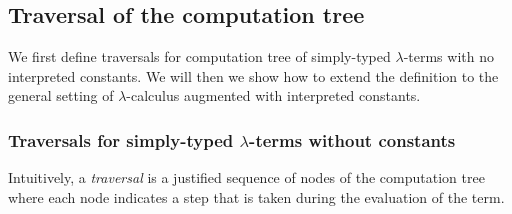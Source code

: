 \subsection{Traversal of the computation tree}
\label{subsec:traversal} We first define traversals for computation
tree of simply-typed $\lambda$-terms with no interpreted constants.
We will then we show how to extend the definition to the general
setting of $\lambda$-calculus augmented with interpreted constants.

\subsubsection{Traversals for simply-typed $\lambda$-terms without constants}
Intuitively, a \emph{traversal} is a justified sequence of nodes of the computation tree where each node
indicates a step that is taken during the evaluation of the term.

